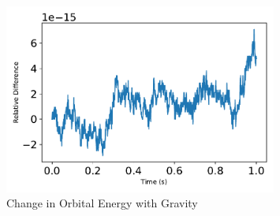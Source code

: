 \begin{figure}[htbp]\centerline{\includegraphics[width=0.8\textwidth]{AutoTeX/ChangeInOrbitalEnergySystem}}\caption{Change in Orbital Energy with Gravity}\label{fig:ChangeInOrbitalEnergySystem}\end{figure}
